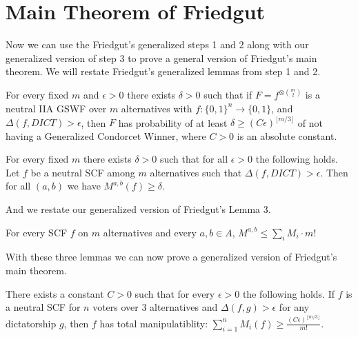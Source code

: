 \section{Main Theorem of Friedgut}

	Now we can use the Friedgut's generalized steps 1 and 2 along with our generalized version of step 3 to prove a general version of Friedgut's main theorem. We will restate Friedgut's generalized lemmas from step 1 and 2.

	\begin{lemma}
		\label{friedgut-lemma-1}
		For every fixed $m$ and $\epsilon > 0$ there exists $\delta > 0$ such that if $F = f^{\otimes \binom{m}{2}}$ is a neutral IIA GSWF over $m$ alternatives with $f : \{0,1\}^n \rightarrow \{0,1\}$, and $\Delta(f, DICT) > \epsilon$, then $F$ has probability of at least $\delta \ge (C\epsilon)^{\lfloor m/3 \rfloor}$ of not having a Generalized Condorcet Winner, where $C > 0$ is an absolute constant.
	\end{lemma}

	\begin{lemma}
		\label{friedgut-lemma-2}
		For every fixed $m$ there exists $\delta > 0$ such that for all $\epsilon > 0$ the following holds. Let $f$ be a neutral SCF among $m$ alternatives such that $\Delta(f, DICT) > \epsilon$. Then for all $(a,b)$ we have $M^{a,b}(f) \ge \delta$.
	\end{lemma}

	And we restate our generalized version of Friedgut's Lemma 3.

	\begin{conjecture}
		\label{friedgut-lemma-3}
		For every SCF $f$ on $m$ alternatives and every $a,b \in A$, $M^{a,b} \le \sum_i M_i \cdot m!$
	\end{conjecture}

	With these three lemmas we can now prove a generalized version of Friedgut's main theorem.

	\begin{conjecture}
		There exists a constant $C > 0$ such that for every $\epsilon > 0$ the following holds. If $f$ is a neutral SCF for $n$ voters over 3 alternatives and $\Delta(f, g) > \epsilon$ for any dictatorship $g$, then $f$ has total manipulatiblity: $\sum^n_{i=1} M_i(f) \ge \frac{(C\epsilon)^{\lfloor m/3 \rfloor}}{m!}$.
	\end{conjecture}

